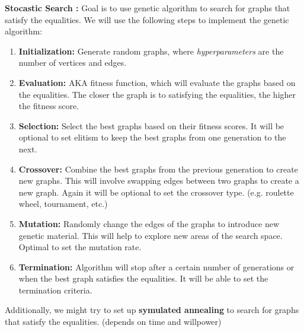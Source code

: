 \documentclass[12pt]{article}
\begin{document}
\textbf{Stocastic Search :} Goal is to use genetic algorithm to search for graphs that satisfy the equalities. We will use the following steps to implement the genetic algorithm:
\begin{enumerate}
  \item \textbf{Initialization:} Generate random graphs, where \textit{hyperparameters} are the number of vertices and edges.
  \item \textbf{Evaluation:} AKA fitness function, which will evaluate the graphs based on the equalities. The closer the graph is to satisfying the equalities, the higher the fitness score.
  \item \textbf{Selection:} Select the best graphs based on their fitness scores. It will be optional to set elitism to keep the best graphs from one generation to the next.
  \item \textbf{Crossover:} Combine the best graphs from the previous generation to create new graphs. This will involve swapping edges between two graphs to create a new graph. Again it will be optional to set the crossover type. (e.g. roulette wheel, tournament, etc.)
  \item \textbf{Mutation:} Randomly change the edges of the graphs to introduce new genetic material. This will help to explore new areas of the search space. Optimal to set the mutation rate.
  \item \textbf{Termination:} Algorithm will stop after a certain number of generations or when the best graph satisfies the equalities. It will be able to set the termination criteria.

\end{enumerate}

Additionally, we might try to set up \textbf{symulated annealing} to search for graphs that satisfy the equalities. (depends on time and willpower)
\end{document}
